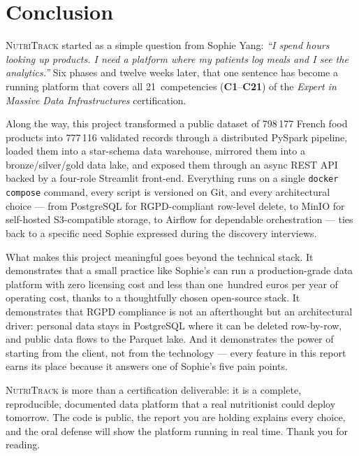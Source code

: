 \documentclass[a4paper,11pt,oneside,openany]{report}
\newcommand{\competence}[1]{\textbf{\textcolor{ntgreen}{#1}}}
\newcommand{\nutritrack}{\textsc{NutriTrack}}
\newcommand{\rgpd}{RGPD}
\begin{document}
\chapter*{Conclusion}

\nutritrack{} started as a simple question from Sophie Yang: \textit{``I spend
hours looking up products. I need a platform where my patients log meals and I
see the analytics.''} Six phases and twelve weeks later, that one sentence has
become a running platform that covers all 21~competencies
(\competence{C1}--\competence{C21}) of the
\textit{Expert in Massive Data Infrastructures} certification.

Along the way, this project transformed a public dataset of 798\,177 French
food products into 777\,116 validated records through a distributed PySpark
pipeline, loaded them into a star-schema data warehouse, mirrored them into a
bronze/silver/gold data lake, and exposed them through an async REST API
backed by a four-role Streamlit front-end. Everything runs on a single
\texttt{docker compose} command, every script is versioned on Git, and every
architectural choice --- from PostgreSQL for \rgpd{}-compliant row-level
delete, to MinIO for self-hosted S3-compatible storage, to Airflow for
dependable orchestration --- ties back to a specific need Sophie expressed
during the discovery interviews.

What makes this project meaningful goes beyond the technical stack. It
demonstrates that a small practice like Sophie's can run a production-grade
data platform with zero licensing cost and less than one~hundred euros per
year of operating cost, thanks to a thoughtfully chosen open-source stack.
It demonstrates that \rgpd{} compliance is not an afterthought but an
architectural driver: personal data stays in PostgreSQL where it can be
deleted row-by-row, and public data flows to the Parquet lake. And it
demonstrates the power of starting from the client, not from the technology
--- every feature in this report earns its place because it answers one of
Sophie's five pain points.

\nutritrack{} is more than a certification deliverable: it is a complete,
reproducible, documented data platform that a real nutritionist could deploy
tomorrow. The code is public, the report you are holding explains every
choice, and the oral defense will show the platform running in real time.
Thank you for reading.
\end{document}
